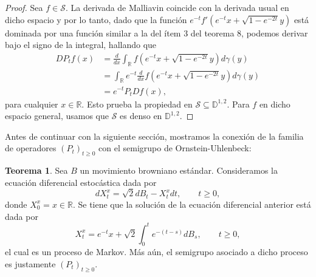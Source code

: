 \documentclass[letterpaper,twoside,12pt]{book}
\newcommand{\R}{\mathbb{R}}
\newcommand{\D}{\mathbb{D}}
\renewcommand{\S}{\mathcal{S}}
\newcommand{\1}{\mathds{1}}
\theoremstyle{definition}
\theoremstyle{definition}
\newtheorem{teo}{Teorema}
\theoremstyle{remark}
\theoremstyle{definition}
\theoremstyle{definition}
\theoremstyle{definition}
\theoremstyle{definition}
\theoremstyle{definition}
\begin{document}
 \begin{proof} 
   Sea $f\in \S$. La derivada de Malliavin coincide con la derivada usual en dicho espacio y por lo tanto, dado que la función $e^{-t}f' \left(e^{-t}x+\sqrt{1-e^{-2t}}y\right)$ está dominada por una función similar a la del ítem 3 del teorema 8, podemos derivar bajo el signo de la integral, hallando que
   \begin{align*}
       DP_tf(x)&=\frac{d}{dx}\int_\R f \left(e^{-t}x+\sqrt{1-e^{-2t}}y\right)d\gamma(y)\\
       &=\int_\R e^{-t}\frac{d}{dx}f\left(e^{-t}x+\sqrt{1-e^{-2t}}y\right)d\gamma(y)\\
       &=e^{-t}P_t Df(x),
   \end{align*}
   para cualquier $x\in \R$. Esto prueba la propiedad en $\S\subseteq \D^{1,2}$. Para $f$ en dicho espacio general, usamos que $\S$ es denso en $\D^{1,2}$.
  \end{proof}
  Antes de continuar con la siguiente sección, mostramos la conexión de la familia de operadores $(P_t)_{t\geq0}$ con el semigrupo de Ornstein-Uhlenbeck:
  \begin{teo} 
   Sea $B$ un movimiento browniano estándar. Consideramos la ecuación diferencial estocástica dada por 
   \[
   dX_t^{x}=\sqrt{2}dB_t-X^{x}_tdt, \qquad t\geq0,
   \]
   donde $X^{x}_0=x\in \R$. Se tiene que la solución de la ecuación diferencial anterior está dada por 
   \[
   X_t^x=e^{-t}x+\sqrt{2}\int_0^te^{-(t-s)}dB_s, \qquad t\geq0,
   \]
   el cual es un proceso de Markov. Más aún, el semigrupo asociado a dicho proceso es justamente $(P_t)_{t\geq0}$.
\end{teo}
   
\end{document}
